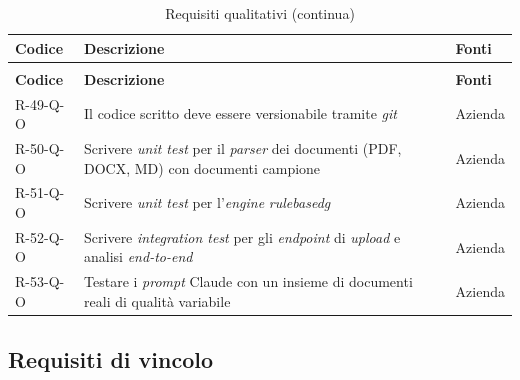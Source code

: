 \begin{xltabular}{\textwidth}{lXl}
    \caption{Requisiti qualitativi} \label{tab:requisiti-qualitativi} \\ %
    \hline\hline
    \textbf{Codice} & \textbf{Descrizione} & \textbf{Fonti} \\
    \hline
    \endfirsthead %

    \caption*{Requisiti qualitativi (continua)} \\ %
    \hline
    \textbf{Codice} & \textbf{Descrizione} & \textbf{Fonti} \\
    \hline
    \endhead %

    R-49-Q-O & Il codice scritto deve essere versionabile tramite \emph{git} & Azienda \\ \hline
    R-50-Q-O & Scrivere \emph{unit test} per il \emph{parser} dei documenti (PDF, DOCX, MD) con documenti campione & Azienda \\ \hline
    R-51-Q-O & Scrivere \emph{unit test} per l'\emph{engine} \emph{\gls{rulebasedg}} & Azienda \\ \hline
    R-52-Q-O & Scrivere \emph{integration test} per gli \emph{endpoint} di \emph{upload} e analisi \emph{end-to-end} & Azienda \\ \hline
    R-53-Q-O & Testare i \emph{prompt} Claude con un insieme di documenti reali di qualità variabile & Azienda \\ \hline
\end{xltabular}

\subsection{Requisiti di vincolo}

